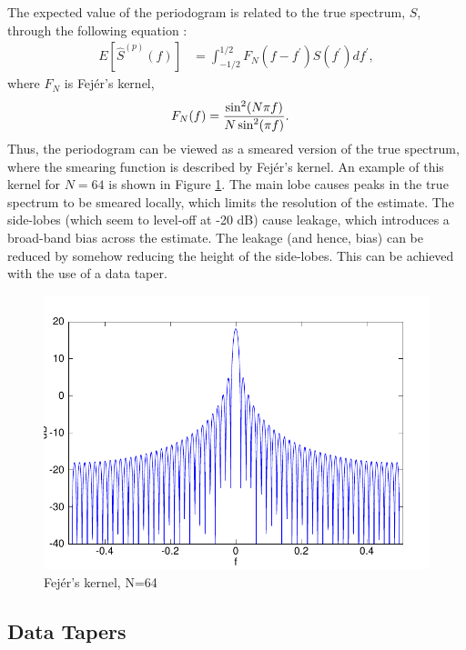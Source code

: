 The expected value of the periodogram is related to the true spectrum, $S$, through the following equation \cite{percival:multitaper}:
\begin{align}
    E\left[\hat{S}^{(p)}(f)\right] & = \int_{-1/2}^{1/2}F_N(f-f^\prime)S(f^\prime)df^\prime,
\end{align}
where $F_N$ is Fej\'er's kernel,
\begin{align*}
    F_N(f) & = \dfrac{\sin^2(N \pi f)}{ N \sin^2(\pi f) }.\index{Fej\'er's kernel}
\end{align*}
Thus, the periodogram can be viewed as a smeared version of the true spectrum, where the smearing function is described by Fej\'er's kernel.  An example of this kernel for $N=64$ is shown in Figure \ref{fig:fejer}.  The main lobe causes peaks in the true spectrum to be smeared locally, which limits the resolution of the estimate.  The side-lobes (which seem to level-off at -20 dB) cause leakage, which introduces a broad-band bias across the estimate.  The leakage (and hence, bias) can be reduced by somehow reducing the height of the side-lobes.  This can be achieved with the use of a data taper.

\begin{figure}
    \centering
    \includegraphics[width=4.5in]{pics/fejer64.pdf}
    \caption[Fej\'er's kernel]{Fej\'er's kernel, N=64 \label{fig:fejer}}
\end{figure}

\subsection{Data Tapers \label{sec:tapers}}

